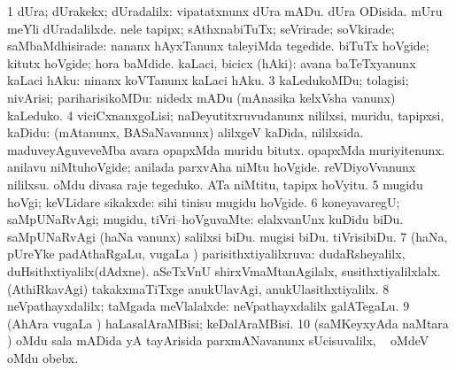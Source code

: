 \bentry
{}
\gl{\kirxvi}
\bmng
\bnum
\num{1} dUra; dUrakekx; dUradalilx:  vipatatxnunx dUra mADu.  dUra ODisida.  mUru meYli dUradalilxde. 
\banum
{} nele tapipx; sAthxnabiTuTx; seVrirade; soVkirade; saMbaMdhisirade:  nananx hAyxTanunx taleyiMda tegedide.  biTuTx hoVgide; kitutx hoVgide; hora baMdide. 
 kaLaci, bicicx (hAki):  avana baTeTxyanunx kaLaci hAku:  ninanx koVTanunx kaLaci hAku. 
\eanum
\numie
\num{3} kaLedukoMDu; tolagisi; nivArisi; pariharisikoMDu:  nidedx mADu (mAnasika kelxVsha \mo vanunx) kaLeduko. 
\num{4} viciCxnanxgoLisi; naDeyutitxruvudanunx nililxsi, muridu, tapipxsi, kaDidu:  (mAtanunx, BASaNavanunx) alilxgeV kaDida, nililxsida.  maduveyAguveveMba avara opapxMda muridu bitutx.  opapxMda muriyitenunx.  anilavu niMtuhoVgide; anilada parxvAha niMtu hoVgide.  reVDiyoVvanunx nililxsu.  oMdu divasa raje tegeduko.  ATa niMtitu, tapipx hoVyitu. 
\num{5} mugidu hoVgi; keVLidare sikakxde:  sihi tinisu mugidu hoVgide. 
\num{6} koneyavaregU; saMpUNaRvAgi; mugidu, tiVri--hoVguvaMte:  elalxvanUnx kuDidu biDu.  saMpUNaRvAgi (haNa \mo vanunx) salilxsi biDu.  mugisi biDu.  tiVrisibiDu. 
\num{7} (haNa, pUreYke padAthaRgaLu, \mo vugaLa \vi) parisithxtiyalilxruva:  dudaRsheyalilx, duHsithxtiyalilx(dAdxne).  aSeTxVnU shirxVmaMtanAgilalx, susithxtiyalilxlalx.  (AthiRkavAgi) takakxmaTiTxge anukUlavAgi, anukUlasithxtiyalilx. 
\num{8} neVpathayxdalilx; taMgada meVlalalxde:  neVpathayxdalilx galATegaLu. 
\num{9} (AhAra \mo vugaLa \vi) haLasalAraMBisi; keDalAraMBisi. 
\num{10} (saMKeyxyAda naMtara \parx) oMdu sala mADida yA tayArisida parxmANavanunx sUcisuvalilx, \kanmu\  oMdeV oMdu obebx. 
\enum
\emng

